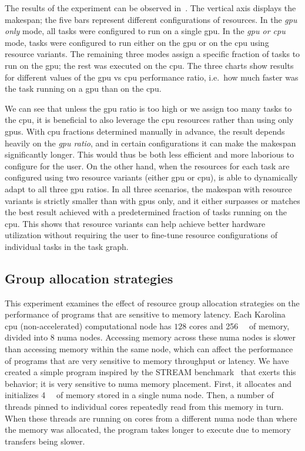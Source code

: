 \vspace{1mm}The results of the experiment can be observed in~.
The vertical axis displays the makespan; the five bars represent different configurations of resources. In the
\emph{\gls{gpu} only} mode, all tasks were configured to run on a single
\gls{gpu}. In the \emph{\gls{gpu} or \gls{cpu}} mode, tasks were configured to run either
on the \gls{gpu} or on the \gls{cpu} using resource variants. The
remaining three modes assign a specific fraction of tasks to run on the \gls{gpu};
the rest was executed on the \gls{cpu}. The three charts show results for different
values of the \gls{gpu} vs \gls{cpu} performance ratio, i.e.\ how much
faster was the task running on a \gls{gpu} than on the \gls{cpu}.

We can see that unless the \gls{gpu} ratio is too high or we assign too many tasks to
the \gls{cpu}, it is beneficial to also leverage the \gls{cpu}
resources rather than using only \glspl{gpu}. With \gls{cpu} fractions
determined manually in advance, the result depends heavily on the \emph{\gls{gpu} ratio}, and in
certain configurations it can make the makespan significantly longer. This would thus be both less
efficient and more laborious to configure for the user. On the other hand, when the resources for
each task are configured using two resource variants (either \gls{gpu} or
\gls{cpu}), \hyperqueue{} is able to dynamically adapt to all three
\gls{gpu} ratios. In all three scenarios, the makespan with resource variants is
strictly smaller than with \glspl{gpu} only, and it either surpasses or matches the
best result achieved with a predetermined fraction of tasks running on the \gls{cpu}.
This shows that resource variants can help achieve better hardware utilization without requiring
the user to fine-tune resource configurations of individual tasks in the task graph.

\subsection{Group allocation strategies}
\label{sec:hq-exp-numa}
This experiment examines the effect of resource group allocation strategies on the
performance of programs that are sensitive to memory latency. Each Karolina
\gls{cpu} (non-accelerated)
computational node has $128$ cores and \SI{256}{\gibi\byte} of memory, divided
into $8$ \gls{numa} nodes. Accessing memory across these
\gls{numa} nodes is slower than accessing memory within the same node, which can
affect the performance of programs that are very sensitive to memory throughput or latency. We have
created a simple program inspired by the STREAM benchmark~\cite{stream} that exerts this
behavior; it is very sensitive to \gls{numa} memory placement. First, it allocates and
initializes \SI{4}{\gibi\byte} of memory stored in a single \gls{numa} node.
Then, a number of threads pinned to individual cores repeatedly read from this memory in turn. When
these threads are running on cores from a different \gls{numa} node than where the memory was
allocated, the program takes longer to execute due to memory transfers being slower.

